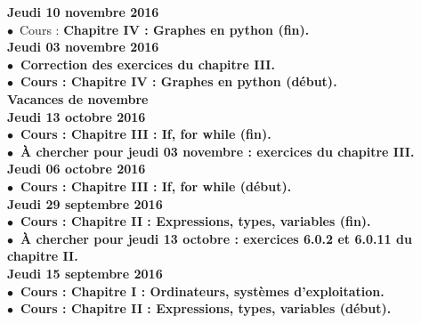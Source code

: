 \documentclass[12pt,a4paper]{article}
\begin{document}
\noindent\textbf{\bf Jeudi 10 novembre 2016 \rm}\\
$\bullet$\ Cours : \bf Chapitre IV \rm : Graphes en python (fin).\vspace{.4cm}\\

\noindent\textbf{\bf Jeudi 03 novembre 2016 \rm}\\
$\bullet$\ Correction des exercices du chapitre III.\\
$\bullet$\ Cours : \bf Chapitre IV \rm : Graphes en python (début).\vspace{.4cm}\\

\noindent\textbf{ Vacances de novembre }\vspace{.4cm}\\

\noindent\textbf{\bf Jeudi 13 octobre 2016 \rm}\\
$\bullet$\ Cours : \bf Chapitre III \rm : If, for while (fin).\vspace{.4cm}\\
$\bullet$\ À chercher pour jeudi 03 novembre : exercices du chapitre III.\vspace{.4cm}\\
  
\noindent\textbf{\bf Jeudi 06 octobre 2016 \rm}\\
$\bullet$\ Cours : \bf Chapitre III \rm : If, for while (début).\vspace{.4cm}\\
  
\noindent\textbf{\bf Jeudi 29 septembre 2016 \rm}\\
$\bullet$\ Cours :  \bf Chapitre II \rm : Expressions, types, variables (fin).\\
$\bullet$\ À chercher pour jeudi 13 octobre : exercices 6.0.2 et 6.0.11 du chapitre 
II.\vspace{.4cm}\\

\noindent\textbf{\bf Jeudi 15 septembre 2016 \rm}\\
$\bullet$\ Cours :  \bf Chapitre I \rm : Ordinateurs, systèmes d'exploitation.\vspace{.4cm}\\
$\bullet$\ Cours :  \bf Chapitre II \rm : Expressions, types, variables (début).\vspace{.4cm}\\


\label{end}
\end{document}
